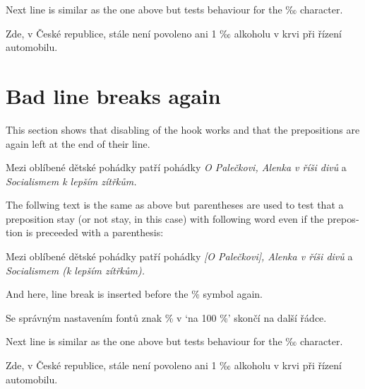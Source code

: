 \documentclass{article}
\newcommand{\expl}[1]{\begin{english}\sffamily #1\end{english}}
\begin{document}
\expl{Next line is similar as the one above but tests behaviour for the ‰
  character.}

Zde, v České republice, stále není povoleno ani 1 ‰ alkoholu v krvi při
řízení automobilu.


\section{Bad line breaks again}
\expl{This section shows that disabling of the hook works and that the
  prepositions are again left at the end of their line.}

\cstypoSingleLetterDisable{}
\cstypoPercentsDisable{}
\cstypoALetterDisable{}

Mezi oblíbené dětské pohádky patří pohádky \emph{O Palečkovi, Alenka v říši
  divů} a \emph{Socialismem k lepším zítřkům.}

\expl{The follwing text is the same as above but parentheses are used to test
  that a preposition stay (or not stay, in this case) with following word
  even if the prepostion is preceeded with a parenthesis:}

Mezi oblíbené dětské pohádky patří pohádky \emph{[O Palečkovi], Alenka v říši
  divů} a \emph{Socialismem (k lepším zítřkům).}

\expl{And here, line break is inserted before the \% symbol again.}

Se správným nastavením fontů znak \% v `na 100 \%' skončí na další řádce.

\expl{Next line is similar as the one above but tests behaviour for the ‰
  character.}

Zde, v České republice, stále není povoleno ani 1 ‰ alkoholu v krvi při
řízení automobilu.
\end{document}
